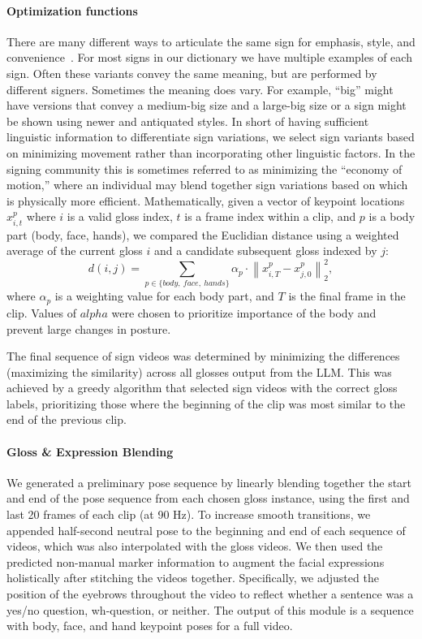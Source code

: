 \paragraph{Optimization functions}
There are many different ways to articulate the same sign for emphasis, style, and convenience~\cite{baker1991american,brentari1998prosodic}. For most signs in our dictionary we have multiple examples of each sign. Often these variants convey the same meaning, but are performed by different signers. Sometimes the meaning does vary. For example, ``big'' might have versions that convey a medium-big size and a large-big size or a sign might be shown using newer and antiquated styles. In short of having sufficient linguistic information to differentiate sign variations, we select sign variants based on minimizing movement rather than incorporating other linguistic factors. In the signing community this is sometimes referred to as minimizing the ``economy of motion,'' where an individual may blend together sign variations based on which is physically more efficient.  Mathematically, given a vector of keypoint locations $x_{i,t}^p$ where $i$ is a valid gloss index, $t$ is a frame index within a clip, and $p$ is a body part (body, face, hands), we compared the Euclidian distance using a weighted average of the current gloss $i$ and a candidate subsequent gloss indexed by $j$:
\begin{equation}
	d(i, j) = \sum_{p \in \{body,\ face,\ hands\}} \alpha_{p} \cdot \left\|x_{i,T}^p - x_{j,0}^p\right\|_2^2,
\end{equation}
where $\alpha_p$ is a weighting value for each body part, and $T$ is the final frame in the clip. Values of $alpha$ were chosen to prioritize importance of the body and prevent large changes in posture.

The final sequence of sign videos was determined by minimizing the differences (maximizing the similarity) across all glosses output from the LLM. This was achieved by a greedy algorithm that selected sign videos with the correct gloss labels, prioritizing those where the beginning of the clip was most similar to the end of the previous clip. 

\paragraph{Gloss \& Expression Blending}
We generated a preliminary pose sequence by linearly blending together the start and end of the pose sequence from each chosen gloss instance, using the first and last 20 frames of each clip (at 90 Hz). To increase smooth transitions, we appended half-second neutral pose to the beginning and end of each sequence of videos, which was also interpolated with the gloss videos. We then used the predicted non-manual marker information to augment the facial expressions holistically after stitching the videos together. Specifically, we adjusted the position of the eyebrows throughout the video to reflect whether a sentence was a yes/no question, wh-question, or neither. The output of this module is a sequence with body, face, and hand keypoint poses for a full video. 

